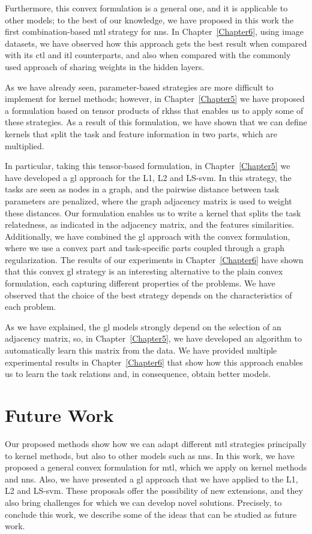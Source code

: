 %
Furthermore, this convex formulation is a general one, and it is applicable to other models; to the best of our knowledge, we have proposed in this work the first combination-based \acrshort{mtl} strategy for \acrshort{nns}.
%
In Chapter~\ref{Chapter6}, using image datasets, we have observed how this approach gets the best result when compared with its \acrshort{ctl} and \acrshort{itl} counterparts, and also when compared with the commonly used approach of sharing weights in the hidden layers.


%
As we have already seen, parameter-based strategies are more difficult to implement for kernel methods; however, in Chapter~\ref{Chapter5} we have proposed a formulation based on tensor products of \acrfull{rkhss} that enables us to apply some of these strategies.
As a result of this formulation, we have shown that we can define kernels that split the task and feature information in two parts, which are multiplied.

In particular, taking this tensor-based formulation, in Chapter~\ref{Chapter5} we have developed a \acrfull{gl} approach for the L1, L2 and LS-\acrshort{svm}. In this strategy, the tasks are seen as nodes in a graph, and the pairwise distance between task parameters are penalized, where the graph adjacency matrix is used to weight these distances.
Our formulation enables us to write a kernel that splits the task relatedness, as indicated in the adjacency matrix, and the features similarities.
%
Additionally, we have combined the \acrshort{gl} approach with the convex formulation, where we use a convex part and task-specific parts coupled through a graph regularization.
%
The results of our experiments in Chapter~\ref{Chapter6} have shown that this convex \acrshort{gl} strategy is an interesting alternative to the plain convex formulation, each capturing different properties of the problems. We have observed that the choice of the best strategy depends on the characteristics of each problem.

As we have explained, the \acrshort{gl} models strongly depend on the selection of an adjacency matrix, so, in Chapter~\ref{Chapter5}, we have developed an algorithm to automatically learn this matrix from the data.
We have provided multiple experimental results in Chapter~\ref{Chapter6} that show how this approach enables us to learn the task relations and, in consequence, obtain better models.


\section{Future Work}
Our proposed methods show how we can adapt different \acrshort{mtl} strategies principally to kernel methods, but also to other models such as \acrshort{nns}. 
In this work, we have proposed a general convex formulation for \acrshort{mtl}, which we apply on kernel methods and \acrshort{nns}. Also, we have presented a \acrshort{gl} approach that we have applied to the L1, L2 and LS-\acrshort{svm}.
%
These proposals offer the possibility of new extensions, and they also bring challenges for which we can develop novel solutions. Precisely, to conclude this work, we describe some of the ideas that can be studied as future work.

